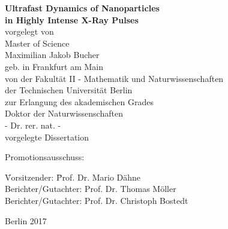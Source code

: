 %
\begin{fullsizetitle}
\vspace{40mm}
\begin{center}
%
{\LARGE \textbf{Ultrafast Dynamics of Nanoparticles\\in Highly Intense X-Ray Pulses\vspace{20mm}\\}}%
{\large%
vorgelegt von
\vspace{4mm}\\
Master of Science}%
\vspace{2mm}\\
%
{\Large Maximilian Jakob Bucher}
\vspace{4mm}\\
%
{\large geb. in Frankfurt am Main} %
\vspace{20mm}
\\
%
{\large %
von der Fakultät II - Mathematik und Naturwissenschaften
\vspace{1mm}\\
der Technischen Universität Berlin
\vspace{1mm}\\
zur Erlangung des akademischen Grades
%
\vspace{5mm}
\\
%
Doktor der Naturwissenschaften
\vspace{1mm}\\
- Dr. rer. nat. -
%
\vspace{10mm}
\\
%
%
vorgelegte Dissertation
\vspace{10mm}}
\\
\end{center}
%
{\large%
\hspace{22mm}Promotionsausschuss:
%
%
\begin{tabbing}
%
\hspace{22mm}\= Vorsitzender:\hspace{20mm} \= Prof. Dr. Mario Dähne \\
\>Berichter/Gutachter: \> Prof. Dr. Thomas Möller \\
\>Berichter/Gutachter: \> Prof. Dr. Christoph Bostedt
%
\end{tabbing}
%
\leavevmode
\hspace{22mm}%
}
%
\begin{center}
%
\vspace{20mm}
%
{\large %
Berlin 2017}
%
\end{center}
%
\end{fullsizetitle}
%
%